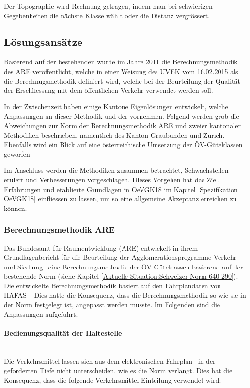 Der Topographie wird Rechnung getragen, indem man bei schwierigen Gegebenheiten die nächste Klasse wählt oder die Distanz vergrössert.

\subsection{Lösungsansätze}
\label{Stand der Technik:Lösungsansätze}
Basierend auf der bestehenden  wurde im Jahre 2011 die Berechnungsmethodik des \ac{ARE} veröffentlicht, welche in einer Weisung des \acs{UVEK} vom 16.02.2015 als die Berechnugsmethodik definiert wird, welche bei der Beurteilung der Qualität der Erschliessung mit dem öffentlichen Verkehr verwendet werden soll.

In der Zwischenzeit haben einige Kantone Eigenlösungen entwickelt, welche Anpassungen an dieser Methodik und der  vornehmen.
Folgend werden grob die Abweichungen zur Norm der Berechnungsmethodik ARE und zweier kantonaler Methodiken beschrieben, namentlich des Kanton Graubünden und Zürich.
Ebenfalls wird ein Blick auf eine österreichische Umsetzung der \gls{ÖV-Güteklassen} geworfen.

Im Anschluss werden die Methodiken zusammen betrachtet, Schwachstellen eruiert und Verbesserungen vorgeschlagen.
Dieses Vorgehen hat das Ziel, Erfahrungen und etablierte Grundlagen in \gls{OeVGK18} im Kapitel \ref{Spezifikation OeVGK18} einfliessen zu lassen, um so eine allgemeine Akzeptanz erreichen zu können.

\subsubsection{Berechnungsmethodik ARE}
\label{Lösungsansätze:Berechnungsmethodik ARE}
Das Bundesamt für Raumentwicklung (ARE) entwickelt in ihrem Grundlagenbericht für die Beurteilung der Agglomerationsprogramme Verkehr und Siedlung~\cite{berechnung_are} eine Berechnungsmethodik der \gls{ÖV-Güteklassen} basierend auf der bestehende Norm (siehe Kapitel \ref{Aktuelle Situation:Schweizer Norm 640 290}).
Die entwickelte Berechnungsmethodik basiert auf den Fahrplandaten von HAFAS~\cite{sbb_hafas_spec}.
Dies hatte die Konsequenz, dass die Berechnungsmethodik so wie sie in der Norm festgelegt ist, angepasst werden musste.
Im Folgenden sind die Anpassungen aufgeführt.

\paragraph{Bedienungsqualität der Haltestelle}~\\
\label{Berechnungsmethodik ARE:Bedienungsqualität der Haltestelle}
Die Verkehrsmittel lassen sich aus dem elektronischen Fahrplan~\cite{sbb_hafas_spec} in der geforderten Tiefe nicht unterscheiden, wie es die Norm verlangt.
Dies hat die Konsequenz, dass die folgende Verkehrsmittel-Einteilung verwendet wird:

